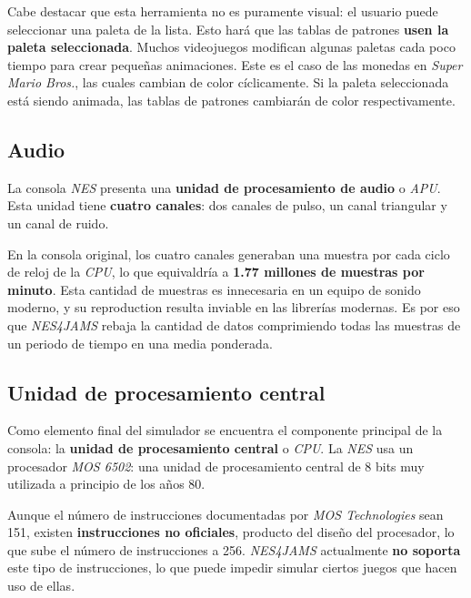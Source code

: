 Cabe destacar que esta herramienta no es puramente visual:
el usuario puede seleccionar una paleta de la lista.
Esto hará que las tablas de patrones \textbf{usen la paleta seleccionada}.
Muchos videojuegos modifican algunas paletas cada poco tiempo
para crear pequeñas animaciones.
Este es el caso de las monedas en \textit{Super Mario Bros.}, las cuales
cambian de color cíclicamente.
Si la paleta seleccionada está siendo animada, las tablas de patrones
cambiarán de color respectivamente.

\subsection{Audio}\label{subsec:audio}

La consola \textit{NES} presenta
una \textbf{unidad de procesamiento de audio} o \textit{APU}.
Esta unidad tiene \textbf{cuatro canales}: dos canales de pulso,
un canal triangular y un canal de ruido.

En la consola original, los cuatro canales generaban una muestra
por cada ciclo de reloj de la \textit{CPU}, lo que equivaldría
a \textbf{1.77 millones de muestras por minuto}.
Esta cantidad de muestras es innecesaria en un equipo de sonido
moderno, y su reproduction resulta inviable en las librerías
modernas.
Es por eso que \textit{NES4JAMS} rebaja la cantidad de datos comprimiendo
todas las muestras de un periodo de tiempo en una media ponderada.

\subsection{Unidad de procesamiento central}\label{subsec:unidad-de-procesamiento-central}

Como elemento final del simulador se encuentra el componente
principal de la consola: la \textbf{unidad de procesamiento central}
o \textit{CPU}.
La \textit{NES} usa un procesador \textit{MOS 6502}: una unidad
de procesamiento central de 8 bits muy utilizada a principio
de los años 80.

Aunque el número de instrucciones documentadas por \textit{MOS Technologies}
sean 151, existen \textbf{instrucciones no oficiales}, producto del diseño
del procesador, lo que sube el número de instrucciones a 256.
\textit{NES4JAMS} actualmente \textbf{no soporta} este tipo de instrucciones,
lo que puede impedir simular ciertos juegos que hacen uso de ellas.

